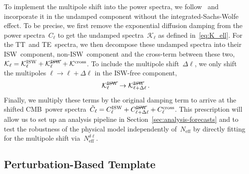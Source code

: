 \documentclass[11pt]{article}
\numberwithin{equation}{section}
\newcommand{\Neff}{N_\mathrm{eff}}
\newcommand{\Nmultipole}{N_\mathrm{eff}^{\delta\ell}}
\begin{document}
To implement the multipole shift into the power spectra, we follow~\cite{Follin:2015hya} and incorporate it in the undamped component without the integrated-Sachs-Wolfe effect. To be precise, we first remove the exponential diffusion damping from the power spectra~$C_\ell$ to get the undamped spectra~$\mathcal{K}_\ell$ as defined in~\eqref{eq:K_ell}. For the TT~and TE~spectra, we then decompose these undamped spectra into their ISW~component, \mbox{non-ISW}~component and the cross-term between these two, $\mathcal{K}_\ell = \mathcal{K}^\mathrm{ISW}_\ell + \mathcal{K}^{\cancel{\mathrm{ISW}}}_\ell + \mathcal{K}^\mathrm{cross}$. To include the multipole shift~$\Delta\ell$, we only shift the multipoles $\ell \to \ell + \Delta\ell$ in the ISW-free component,
\begin{equation}
	\mathcal{K}^{\cancel{\mathrm{ISW}}}_\ell \rightarrow \mathcal{K}^{\cancel{\mathrm{ISW}}}_{\ell + \Delta\ell}\, .	\label{eq:deltaell_data}
\end{equation}
Finally, we multiply these terms by the original damping term to arrive at the shifted CMB~power spectra~$\tilde{C}_\ell = C^\mathrm{ISW}_\ell + C^{\cancel{\mathrm{ISW}}}_{\ell + \Delta\ell} + C_\ell^\mathrm{cross}$. This prescription will allow us to set up an analysis pipeline in Section~\ref{sec:analysis-forecasts} and to test the robustness of the physical model independently of~$\Neff$ by directly fitting for the multipole shift via~$\Nmultipole$.


\subsection{Perturbation-Based Template}
\label{sec:perturbation-based-template}
\end{document}
